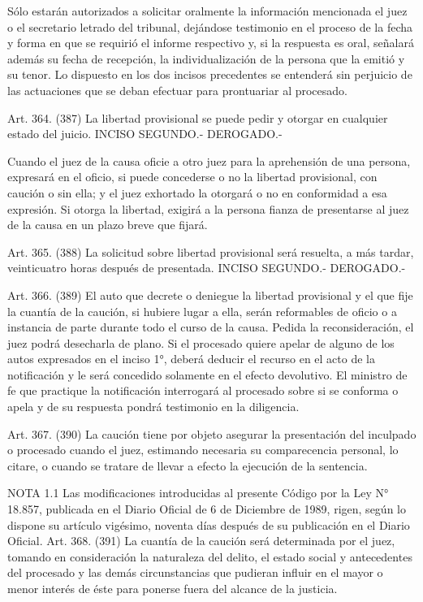     Sólo estarán autorizados a solicitar oralmente la información mencionada el juez o el secretario letrado del tribunal, dejándose testimonio en el proceso de la fecha y forma en que se requirió el informe respectivo y, si la respuesta es oral, señalará además su fecha de recepción, la individualización de la persona que la emitió y su tenor.
    Lo dispuesto en los dos incisos precedentes se entenderá sin perjuicio de las actuaciones que se deban efectuar para prontuariar al procesado.


    Art. 364. (387) La libertad provisional se puede pedir y otorgar en cualquier estado del juicio.
    INCISO SEGUNDO.- DEROGADO.-

    Cuando el juez de la causa oficie a otro juez para la aprehensión de una persona, expresará en el oficio, si puede concederse o no la libertad provisional, con caución o sin ella; y el juez exhortado la otorgará o no en conformidad a esa expresión.
    Si otorga la libertad, exigirá a la persona fianza de presentarse al juez de la causa en un plazo breve que fijará.

    Art. 365. (388) La solicitud sobre libertad provisional será resuelta, a más tardar, veinticuatro horas después de presentada.
    INCISO SEGUNDO.- DEROGADO.-


    Art. 366. (389) El auto que decrete o deniegue la libertad provisional y el que fije la cuantía de la caución, si hubiere lugar a ella, serán reformables de oficio o a instancia de parte durante todo el curso de la causa.
    Pedida la reconsideración, el juez podrá desecharla de plano.
    Si el procesado quiere apelar de alguno de los autos expresados en el inciso 1°, deberá deducir el recurso en el acto de la notificación y le será concedido solamente en el efecto devolutivo. El ministro de fe que practique la notificación interrogará al procesado sobre si se conforma o apela y de su respuesta pondrá testimonio en la diligencia.

    Art. 367. (390) La caución tiene por objeto asegurar la presentación del inculpado o procesado cuando el juez, estimando necesaria su comparecencia personal, lo citare, o cuando se tratare de llevar a efecto la ejecución de la sentencia.


NOTA 1.1
      Las modificaciones introducidas al presente Código por la Ley N° 18.857, publicada en el Diario Oficial de 6 de Diciembre de 1989, rigen, según lo dispone su artículo vigésimo, noventa días después de su publicación en el Diario Oficial.
    Art. 368. (391) La cuantía de la caución será determinada por el juez, tomando en consideración la naturaleza del delito, el estado social y antecedentes del procesado y las demás circunstancias que pudieran influir en el mayor o menor interés de éste para ponerse fuera del alcance de la justicia.

